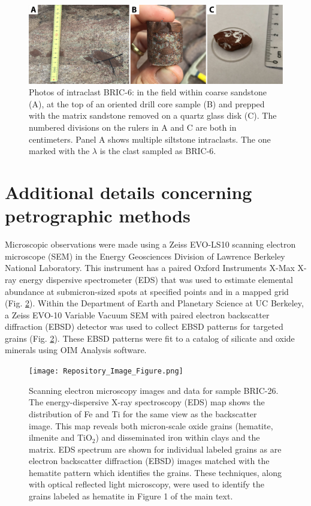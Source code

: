 \documentclass[11pt,letterpaper]{article}
\begin{document}
\begin{figure}[!ht]
\noindent\includegraphics[width=\textwidth]{prep_figure.jpg}
\caption{\small{Photos of intraclast BRIC-6: in the field within coarse sandstone (A), at the top of an oriented drill core sample (B) and prepped with the matrix sandstone removed on a quartz glass disk (C). The numbered divisions on the rulers in A and C are both in centimeters. Panel A shows multiple siltstone intraclasts. The one marked with the $\lambda$ is the clast sampled as BRIC-6.}}
\label{fig:prep_figure}
\end{figure} 

\section*{Additional details concerning petrographic methods}
Microscopic observations were made using a Zeiss EVO-LS10 scanning electron microscope (SEM) in the Energy Geosciences Division of Lawrence Berkeley National Laboratory. This instrument has a paired Oxford Instruments X-Max X-ray energy dispersive spectrometer (EDS) that was used to estimate elemental abundance at submicron-sized spots at specified points and in a mapped grid (Fig. \ref{fig:sem_images}). Within the Department of Earth and Planetary Science at UC Berkeley, a Zeiss EVO-10 Variable Vacuum SEM with paired electron backscatter diffraction (EBSD) detector was used to collect EBSD patterns for targeted grains (Fig. \ref{fig:sem_images}). These EBSD patterns were fit to a catalog of silicate and oxide minerals using OIM Analysis software.

\begin{figure}[!ht]
\centering
\noindent\texttt{[image: Repository\_Image\_Figure.png]}
\caption{\small{Scanning electron microscopy images and data for sample BRIC-26. The energy-dispersive X-ray spectroscopy (EDS) map shows the distribution of Fe and Ti for the same view as the backscatter image. This map reveals both micron-scale oxide grains (hematite, ilmenite and TiO$_2$) and disseminated iron within clays and the matrix. EDS spectrum are shown for individual labeled grains as are electron backscatter diffraction (EBSD) images matched with the hematite pattern which identifies the grains. These techniques, along with optical reflected light microscopy, were used to identify the grains labeled as hematite in Figure 1 of the main text.}}
\label{fig:sem_images}
\end{figure} 
\end{document}
